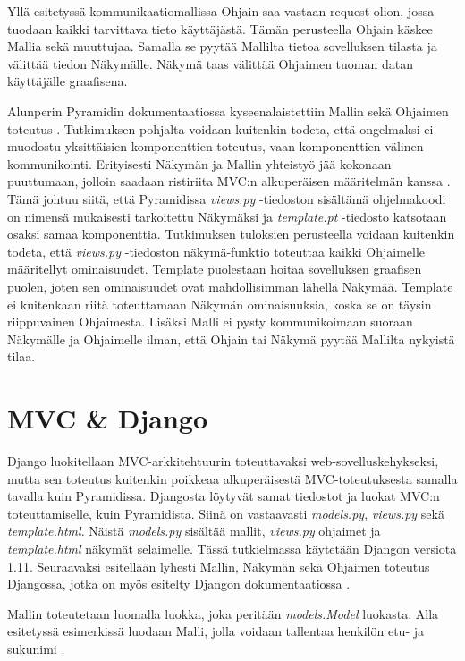 \documentclass[utf8]{gradu3}
\begin{document}
Yllä esitetyssä kommunikaatiomallissa Ohjain saa vastaan request-olion, jossa tuodaan kaikki tarvittava tieto käyttäjästä. Tämän perusteella Ohjain käskee Mallia
sekä muuttujaa. Samalla se pyytää Mallilta tietoa sovelluksen tilasta ja välittää tiedon Näkymälle. Näkymä taas välittää Ohjaimen tuoman datan käyttäjälle graafisena.

Alunperin Pyramidin dokumentaatiossa kyseenalaistettiin Mallin sekä Ohjaimen toteutus \parencite{pyramid_intr}. Tutkimuksen pohjalta voidaan kuitenkin
todeta, että ongelmaksi ei muodostu yksittäisien komponenttien toteutus, vaan komponenttien välinen kommunikointi. Erityisesti Näkymän ja Mallin yhteistyö jää
kokonaan puuttumaan, jolloin saadaan ristiriita MVC:n alkuperäisen määritelmän kanssa \parencite[s. 1]{reenskaug_orig}. Tämä johtuu siitä, että Pyramidissa \emph{views.py} -tiedoston sisältämä ohjelmakoodi on nimensä mukaisesti tarkoitettu Näkymäksi ja
\emph{template.pt} -tiedosto katsotaan osaksi samaa komponenttia. Tutkimuksen tuloksien perusteella voidaan kuitenkin todeta, että \emph{views.py} -tiedoston näkymä-funktio toteuttaa kaikki
Ohjaimelle määritellyt ominaisuudet. Template puolestaan hoitaa sovelluksen graafisen puolen, joten sen ominaisuudet ovat mahdollisimman lähellä Näkymää. Template ei kuitenkaan riitä toteuttamaan Näkymän ominaisuuksia, koska se on täysin riippuvainen Ohjaimesta. Lisäksi Malli ei pysty kommunikoimaan suoraan Näkymälle ja Ohjaimelle ilman, että Ohjain tai Näkymä pyytää Mallilta nykyistä tilaa.

\chapter{MVC \& Django}
Django luokitellaan MVC-arkkitehtuurin toteuttavaksi web-sovelluskehykseksi, mutta sen toteutus kuitenkin poikkeaa alkuperäisestä MVC-toteutuksesta samalla tavalla kuin Pyramidissa. Djangosta löytyvät samat tiedostot  ja luokat MVC:n toteuttamiselle, kuin Pyramidista. Siinä on vastaavasti \emph{models.py}, \emph{views.py} sekä \emph{template.html}. Näistä \emph{models.py} sisältää mallit, \emph{views.py} ohjaimet ja \emph{template.html} näkymät selaimelle. Tässä tutkielmassa  käytetään Djangon versiota 1.11. Seuraavaksi esitellään lyhesti Mallin, Näkymän sekä Ohjaimen toteutus Djangossa, jotka on myös esitelty Djangon dokumentaatiossa \parencite{django_docs}.

Mallin toteutetaan luomalla luokka, joka peritään \emph{models.Model} luokasta. Alla esitetyssä esimerkissä luodaan Malli, jolla voidaan tallentaa henkilön etu- ja sukunimi \parencite{django_model}.
\end{document}
